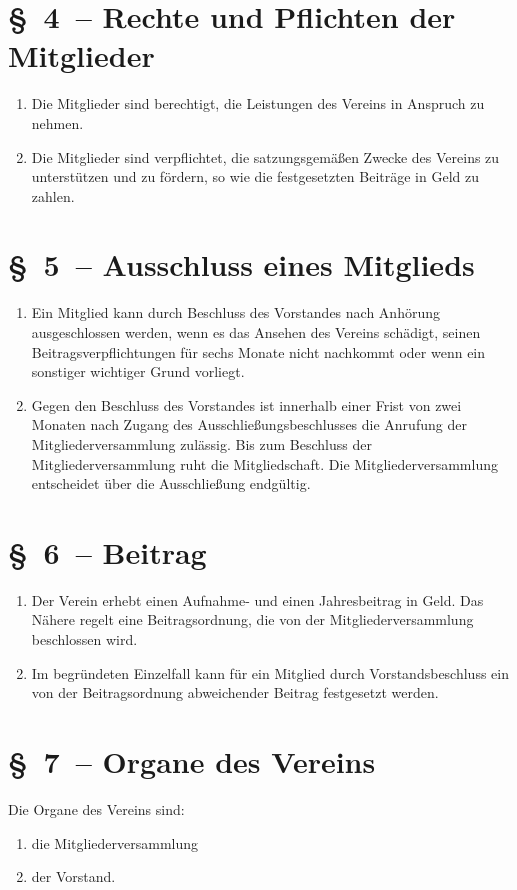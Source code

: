 \documentclass[11pt,DIV12]{scrartcl}
\renewcommand*{\labelenumi}{(\theenumi)}
\begin{document}
\section*{§~4~-- Rechte und Pflichten der Mitglieder}
\begin{enumerate}
\item Die Mitglieder sind berechtigt, die Leistungen des Vereins in Anspruch zu nehmen.
\item Die Mitglieder sind verpflichtet, die satzungsgemäßen Zwecke des Vereins zu unterstützen und zu fördern, so wie die festgesetzten Beiträge in Geld zu zahlen.
\end{enumerate}

\section*{§~5~-- Ausschluss eines Mitglieds}
\begin{enumerate}
\item Ein Mitglied kann durch Beschluss des Vorstandes nach Anhörung ausgeschlossen werden, wenn es das Ansehen des Vereins schädigt, seinen Beitragsverpflichtungen für sechs Monate nicht nachkommt oder wenn ein sonstiger wichtiger Grund vorliegt.
\item Gegen den Beschluss des Vorstandes ist innerhalb einer Frist von zwei Monaten nach Zugang des Ausschließungsbeschlusses die Anrufung der Mitgliederversammlung zulässig. Bis zum Beschluss der Mitgliederversammlung ruht die Mitgliedschaft. Die Mitgliederversammlung entscheidet über die Ausschließung endgültig.
\end{enumerate}

\section*{§~6~-- Beitrag}
\begin{enumerate}
\item Der Verein erhebt einen Aufnahme- und einen Jahresbeitrag in Geld. Das Nähere regelt eine Beitragsordnung, die von der Mitgliederversammlung beschlossen wird.
\item Im begründeten Einzelfall kann für ein Mitglied durch Vorstandsbeschluss ein von der Beitragsordnung abweichender Beitrag festgesetzt werden.
\end{enumerate}

\section*{§~7~-- Organe des Vereins}
Die Organe des Vereins sind:
\begin{enumerate}
    \renewcommand*{\labelenumi}{\theenumi.}
    \addtolength{\leftmargini}{-3pt}
    \addtolength{\leftmargini}{\parindent}
    \item die Mitgliederversammlung
    \item der Vorstand.
\end{enumerate}
\end{document}
